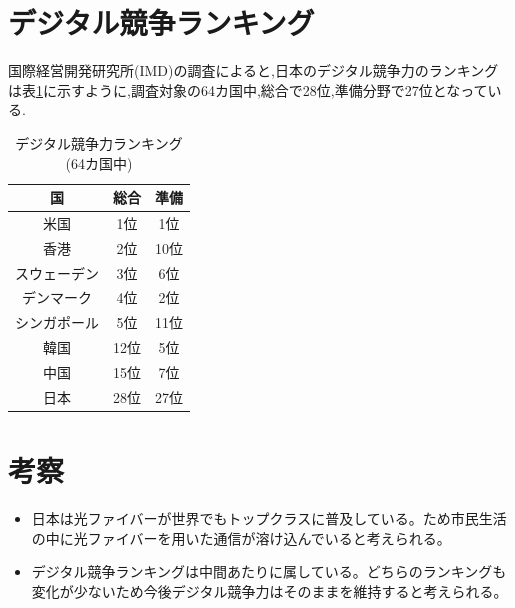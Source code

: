 \documentclass[a4paper,11pt,dvipdfmx]{ujarticle}
\begin{document}
\section{デジタル競争ランキング}
国際経営開発研究所(IMD)の調査\cite{imd}によると,日本のデジタル競争力のランキングは表\ref{tbl:ランキング}に示すように,調査対象の64カ国中,総合で28位,準備分野で27位となっている.

\begin{table}[htbp]
        \centering
    \caption{デジタル競争力ランキング(64カ国中)}
    \label{tbl:ランキング}
    \begin{tabular}{|c|c|c|}
        \hline
        国 & 総合 & 準備 \\
        \hline
        米国 & 1位 & 1位 \\
        \hline
        香港 & 2位 & 10位 \\
        \hline
        スウェーデン & 3位 & 6位 \\
        \hline
        デンマーク & 4位 & 2位 \\
        \hline
        シンガポール & 5位 & 11位 \\
        \hline
        \hline
        韓国 & 12位 & 5位 \\
        \hline
        中国 & 15位 & 7位 \\
        \hline
        \hline
        日本 & 28位 & 27位 \\
        \hline
    \end{tabular}
\end{table}

\section{考察}

\begin{itemize}
    \item 日本は光ファイバーが世界でもトップクラスに普及している。ため市民生活の中に光ファイバーを用いた通信が溶け込んでいると考えられる。
    \item デジタル競争ランキングは中間あたりに属している。どちらのランキングも変化が少ないため今後デジタル競争力はそのままを維持すると考えられる。
\end{itemize}





\end{document}
